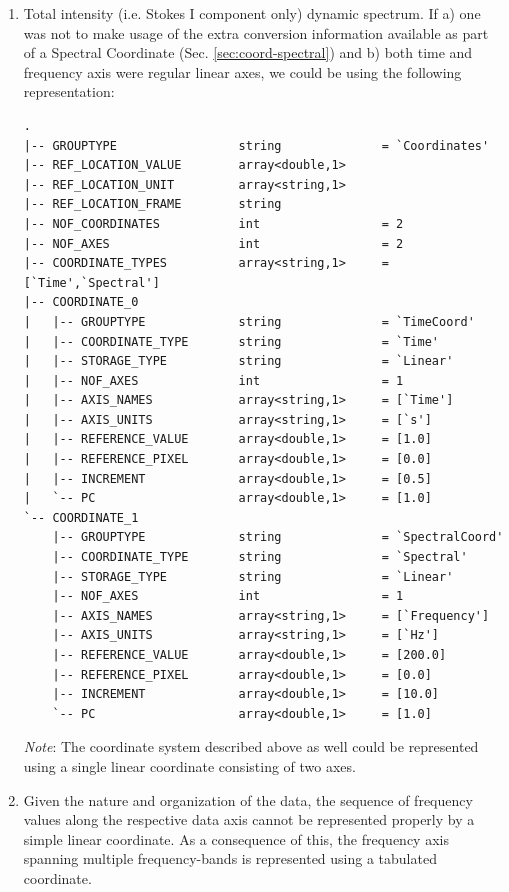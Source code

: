 \documentclass[a4paper,10pt,bibtotoc]{scrreprt}
\begin{document}
\begin{enumerate}
\item Total intensity (i.e. Stokes I component only) dynamic spectrum.
  If a) one was not to make usage of the extra conversion information available
  as part of a Spectral Coordinate (Sec. \ref{sec:coord-spectral}) and b) both
  time and frequency axis were regular linear axes, we could be using
  the following representation:
\begin{lstlisting}
.
|-- GROUPTYPE                 string              = `Coordinates'
|-- REF_LOCATION_VALUE        array<double,1>
|-- REF_LOCATION_UNIT         array<string,1>
|-- REF_LOCATION_FRAME        string
|-- NOF_COORDINATES           int                 = 2
|-- NOF_AXES                  int                 = 2
|-- COORDINATE_TYPES          array<string,1>     = [`Time',`Spectral']
|-- COORDINATE_0
|   |-- GROUPTYPE             string              = `TimeCoord'
|   |-- COORDINATE_TYPE       string              = `Time'
|   |-- STORAGE_TYPE          string              = `Linear'
|   |-- NOF_AXES              int                 = 1
|   |-- AXIS_NAMES            array<string,1>     = [`Time']
|   |-- AXIS_UNITS            array<string,1>     = [`s']
|   |-- REFERENCE_VALUE       array<double,1>     = [1.0]
|   |-- REFERENCE_PIXEL       array<double,1>     = [0.0]
|   |-- INCREMENT             array<double,1>     = [0.5]
|   `-- PC                    array<double,1>     = [1.0]
`-- COORDINATE_1
    |-- GROUPTYPE             string              = `SpectralCoord'
    |-- COORDINATE_TYPE       string              = `Spectral'
    |-- STORAGE_TYPE          string              = `Linear'
    |-- NOF_AXES              int                 = 1
    |-- AXIS_NAMES            array<string,1>     = [`Frequency']
    |-- AXIS_UNITS            array<string,1>     = [`Hz']
    |-- REFERENCE_VALUE       array<double,1>     = [200.0]
    |-- REFERENCE_PIXEL       array<double,1>     = [0.0]
    |-- INCREMENT             array<double,1>     = [10.0]
    `-- PC                    array<double,1>     = [1.0]
\end{lstlisting}
 \textsl{Note}: The coordinate system described above as well could
  be represented using a single linear coordinate consisting of two axes.
\item Given the nature and organization of the data, the sequence of
  frequency values along the respective data axis cannot be
  represented properly by a simple linear coordinate. As a consequence
  of this, the frequency axis spanning multiple frequency-bands is
  represented using a tabulated coordinate.


\end{enumerate}
\end{document}
